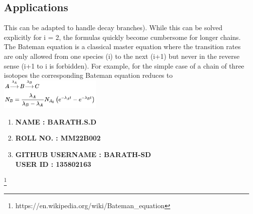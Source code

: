 \documentclass{article}
\begin{document}
\subsection{Applications}
This can be adapted to handle decay branches). While this can be solved explicitly for i = 2, the formulas quickly become cumbersome for longer chains.
The Bateman equation is a classical master equation where the transition rates are only allowed from one species (i) to the next (i+1) but never in the reverse sense (i+1 to i is forbidden). \newline{}
\newline{}
For example, for the simple case of a chain of three isotopes the corresponding Bateman equation reduces to \newline{} \newline{}
\includegraphics[width=5cm]{image.png}
\newline{}
\begin{enumerate}
    \item\textbf{NAME : BARATH.S.D}
    \item\textbf{ROLL NO. : MM22B002}
    \item\textbf{GITHUB USERNAME : BARATH-SD \\ USER ID : 135802163}
\end{enumerate}
\footnote{https://en.wikipedia.org/wiki/Bateman_equation}
\end{document}
